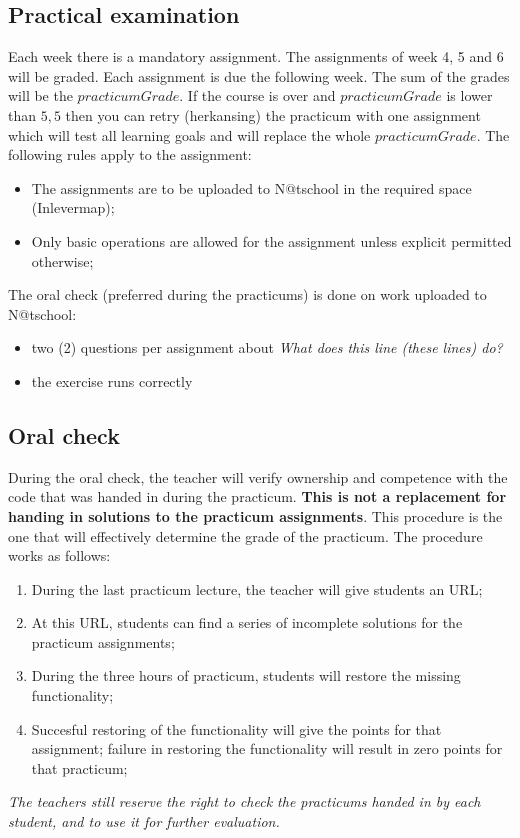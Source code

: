 \subsection{Practical examination \modulecode}
Each week there is a mandatory assignment. The assignments of week 4, 5 and 6 will be graded. Each assignment is due the following week. The sum of the grades will be the $practicumGrade$. 
If the course is over and $practicumGrade$ is lower than $5,5$ then you can retry (herkansing) the practicum with one assignment which will test all learning goals and will replace the whole $practicumGrade$.
The following rules apply to the assignment:
\begin{itemize}
  \item The assignments are to be uploaded to N@tschool in the required space (Inlevermap);
  \item Only basic operations are allowed for the assignment unless explicit permitted otherwise; 
\end{itemize}
The oral check  (preferred during the practicums) is done on work uploaded to N@tschool:
\begin{itemize}
  \item two (2) questions per assignment about \textit{What does this line (these lines) do?}
  \item the exercise runs correctly
\end{itemize}


\subsection{Oral check \modulecode}
During the oral check, the teacher will verify ownership and competence with the code that was handed in during the practicum. \textbf{This is not a replacement for handing in solutions to the practicum assignments}. This procedure is the one that will effectively determine the grade of the practicum. The procedure works as follows:

\begin{enumerate}
\item During the last practicum lecture, the teacher will give students an URL;
\item At this URL, students can find a series of incomplete solutions for the practicum assignments;
\item During the three hours of practicum, students will restore the missing functionality;
\item Succesful restoring of the functionality will give the points for that assignment; failure in restoring the functionality will result in zero points for that practicum;
\end{enumerate}

\textit{The teachers still reserve the right to check the practicums handed in by each student, and to use it for further evaluation.}
